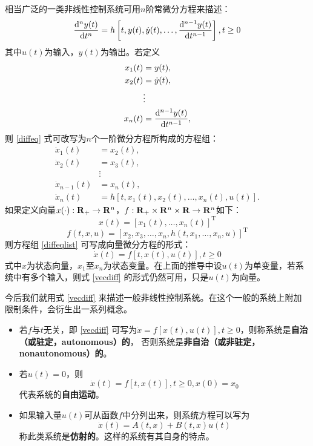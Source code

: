 相当广泛的一类非线性控制系统可用$n$阶常微分方程来描述：
\begin{equation}\label{diffeq}
  \frac{\mathop{}\!\mathrm{d}^n y(t)}{\mathop{}\!\mathrm{d} t^n}=h\left[t,y(t),\dot{y}(t),\dots,\frac{\mathop{}\!\mathrm{d}^{n-1} y(t)}{\mathop{}\!\mathrm{d} t^{n-1}}\right],t\ge 0
\end{equation}
其中$u(t)$为输入，$y(t)$为输出。若定义
\begin{align*}
  x_1(t)&=y(t),\\
  x_2(t)&=\dot{y}(t),\\
  &\vdots\\
  x_n(t)&=\frac{\mathop{}\!\mathrm{d}^{n-1} y(t)}{\mathop{}\!\mathrm{d} t^{n-1}},
\end{align*}
则 \eqref{diffeq} 式可改写为$n$个一阶微分方程所构成的方程组：
\begin{equation}\label{diffeqlist}
  \begin{aligned}
    \dot{x}_1(t)&=x_2(t),\\
    \dot{x}_2(t)&=x_3(t),\\
    &\vdots\\
    \dot{x}_{n-1}(t)&=x_n(t),\\
    \dot{x}_n(t)&=h\left[t,x_1(t),x_2(t),\dots,x_n(t),u(t)\right].
  \end{aligned}
\end{equation}
如果定义向量$x(\cdot):\mathbf{R}{}_+\to\mathbf{R}{}^n$，$f:\mathbf{R}{}_+\times\mathbf{R}{}^n\times\mathbf{R}{}\to\mathbf{R}{}^n$如下：
\[x(t)=[x_1(t),\dots,x_n(t)]^\mathrm{T}\]
\[f(t,x,u)=[x_2,x_3,\dots,x_n,h(t,x_1,\dots,x_n,u)]^\mathrm{T}\]
则方程组 \eqref{diffeqlist} 可写成向量微分方程的形式：
\begin{equation}\label{vecdiff}
  \dot{x}(t)=f[t,x(t),u(t)],t\ge 0
\end{equation}
式中$x$为状态向量，$x_1$至$x_n$为状态变量。在上面的推导中设$u(t)$为单变量，若系统中有多个输入，则式 \eqref{vecdiff} 的形式仍然可用，只是$u(t)$为向量。

今后我们就用式 \eqref{vecdiff} 来描述一般非线性控制系统。在这个一般的系统上附加限制条件，会衍生出一系列概念。

\begin{definition}\label{def:nonlinearconcepts}
  \begin{itemize}[leftmargin=1em]
    \item 若$f$与$t$无关，即 \eqref{vecdiff} 可写为$\dot{x}=f[x(t),u(t)],t\ge 0$，则称系统是{\bf 自治（或驻定，autonomous）的}，
    否则系统是{\bf 非自治（或非驻定，nonautonomous）的}。
    \item 若$u(t)=0$，则\begin{equation}\label{free}
      \dot{x}(t)=f[t,x(t)],t\ge 0,x(0)=x_0
    \end{equation}代表系统的{\bf 自由运动}。
    \item 如果输入量$u(t)$可从函数$f$中分列出来，则系统方程可以写为\[\dot{x}(t)=A(t,x)+B(t,x)u(t)\]称此类系统是{\bf 仿射的}。这样的系统有其自身的特点。
  \end{itemize}
\end{definition}


